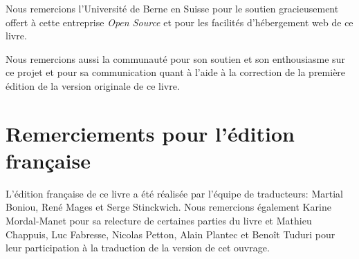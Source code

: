 \documentclass[a4paper,10pt,twoside]{book}
\begin{document}
Nous remercions l'Université de Berne en Suisse pour le soutien
gracieusement offert à cette entreprise \emph{Open Source} et pour
les facilités d'hébergement web de ce livre.

Nous remercions aussi la communauté \squeak pour son soutien et son
enthousiasme sur ce projet et pour sa communication quant à l'aide à
la correction de la première édition de la version originale 
de ce livre.

\section*{Remerciements pour l'édition française}

L'édition française de ce livre a été réalisée par l'équipe de traducteurs: 
Martial Boniou, René Mages et Serge Stinckwich. Nous remercions également Karine Mordal-Manet pour sa relecture de certaines parties du livre et Mathieu Chappuis, Luc Fabresse, Nicolas Petton, Alain Plantec et Benoît Tuduri pour leur participation à la traduction de la version \squeak de cet ouvrage.



\ifx\wholebook\relax\else
   
   
\end{document}
